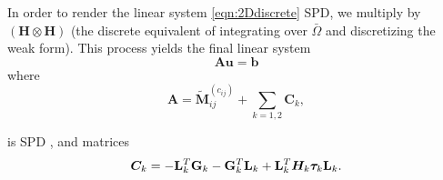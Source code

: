 In order to render the linear system \eqref{eqn:2Ddiscrete} SPD, we multiply by $\left(\boldsymbol{H} \otimes \boldsymbol{H}\right)$ (the discrete equivalent of integrating over $\bar\Omega$ and discretizing the weak form). This process yields the final linear system 
\begin{equation}\label{eqn: final}
   \boldsymbol{A} \boldsymbol{u} = {\boldsymbol{b}} 
\end{equation} where
\begin{equation}\label{eqn:discrete}
\boldsymbol{A} = \tilde{\boldsymbol{M}}^{(c_{ij})}_{ij} + \sum_{k = 1, 2} \boldsymbol{C}_k,
\end{equation}
%

is SPD \citep{Erickson2022}, and matrices
\begin{equation}
    \boldsymbol{C}_k = -{\bf L}_k^T {\bf G}_k - {\bf G}_k^T {\bf L}_k + {\bf L}_k^T \boldsymbol{H}_k \boldsymbol{\tau}_k {\bf L}_k.
\end{equation}

